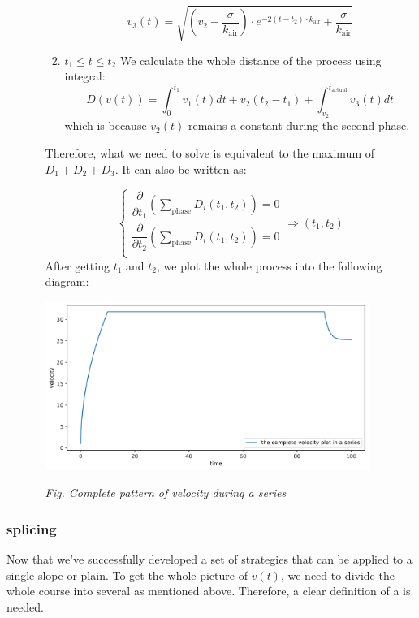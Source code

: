 \documentclass{article}
\begin{document}
\begin{itemize}
\begin{itemize}
\begin{enumerate}
									\[v_3\left( t \right) =\sqrt{\left( v_2-\dfrac{\sigma}{k_{\mathrm{air}}} \right) \cdot e^{-2\left( t-t_2 \right) \cdot k_{\mathrm{air}}}+\dfrac{\sigma}{k_{\mathrm{air}}}}\]


								\item \(t_1\leq t\leq t_2\)
									We calculate the whole distance of the process using integral:
									\[D(v(t))=\int_0^{t_1}v_1(t)dt+v_2(t_2-t_1)+\int_{v_2}^{t_{\mathrm{actual}}}v_3(t)dt\]
									which is because \(v_2(t)\) remains a constant during the second phase.
								\end{enumerate}
							Therefore, what we need to solve is equivalent to the maximum of \(D_1+D_2+D_3\). It can also be written as:

							\[
								\begin{cases}
									\dfrac{\partial}{\partial t_1}\left( \displaystyle\sum\limits_{\mathrm{phase}}{D_i\left( t_1,t_2 \right)} \right) =0\\
									\dfrac{\partial}{\partial t_2}\left( \displaystyle\sum\limits_{\mathrm{phase}}{D_i\left( t_1,t_2 \right)} \right) =0\\
								\end{cases}\Rightarrow \left( t_1,t_2 \right)
							\]
							After getting \(t_1\) and \(t_2\), we plot the whole process into the following diagram:

							\begin{center}
								\includegraphics[height=5.5cm]{complete velocity pattern.png}

								\small\textit{Fig. Complete pattern of velocity during a series}
							\end{center}

					\end{itemize}

			\end{itemize}
		\subsubsection{splicing}
			Now that we've successfully developed a set of strategies that can be applied to a single slope or plain. To get the whole picture of \(v(t)\), we need to divide the whole course into several  as mentioned above. Therefore, a clear definition of a  is needed.
\end{document}
